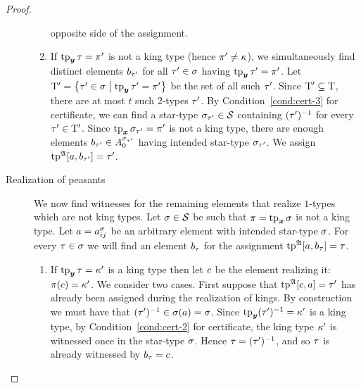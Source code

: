 \begin{proof}
\begin{description}
\begin{enumerate}
  opposite side of the assignment.
  \item If $\operatorname{tp}_{\bm{y}}\tau = {\pi'}$ is not a king type (hence
  ${\pi'} \neq \kappa$), we simultaneously find distinct elements $b_{\tau'}$ for all ${\tau'} \in
  \sigma$ having $\operatorname{tp}_{\bm{y}}{\tau'} = {\pi'}$.
  Let ${\mathrm{T}'} = \left\{{\tau'} \in \sigma\mathrel{}\middle|\mathrel{}\operatorname{tp}_{\bm{y}}{\tau'} = {\pi'}\right\}$ be the set of
  all such ${\tau'}$.
  Since ${\mathrm{T}'} \subseteq \mathrm{T}$, there are
  at most $t$ such $2$-types ${\tau'}$. By Condition~\ref{cond:cert-3} for
  certificate, we can find a star-type $\sigma_{{\tau'}} \in \mathcal{S}$ containing
  $({\tau'})^{-1}$ for every ${\tau'} \in {\mathrm{T}'}$. Since $\operatorname{tp}_{\bm{x}}\sigma_{{\tau'}} =
  {\pi'}$ is not a king type, there are enough elements 
  $b_{{\tau'}} \in A_0^{\sigma_{{\tau'}}}$ having intended star-type
  $\sigma_{{\tau'}}$.
  We assign $\operatorname{tp}^{\mathfrak{A}}[a,b_{\tau'}] = {\tau'}$.
  \end{enumerate}
  \item[Realization of peasants] We now find witnesses for the remaining
  elements that realize $1$-types which are not king types. Let $\sigma \in \mathcal{S}$ be such that $\pi =
  \operatorname{tp}_{\bm{x}}\sigma$ is not a king type. Let $a = a_{ij}^\sigma$ be an arbitrary element
  with intended star-type $\sigma$. For every $\tau \in \sigma$ we will find an
  element $b_\tau$ for the assignment $\operatorname{tp}^{\mathfrak{A}}[a,b_\tau] = \tau$.
  \begin{enumerate}
    \item If $\operatorname{tp}_{\bm{y}}\tau = {\kappa'}$ is a king type then let $c$ be the element
    realizing it: $\pi(c) = {\kappa'}$.
    We consider two cases.
    First suppose that $\operatorname{tp}^{\mathfrak{A}}[c,a] = {\tau'}$ has already been assigned
    during the realization of kings.
    By construction we must have that $({\tau'})^{-1} \in \sigma(a) = \sigma$.
    Since $\operatorname{tp}_{\bm{y}}({\tau'})^{-1} = {\kappa'}$ is a king type,
    by Condition~\ref{cond:cert-2}
    for certificate, the king type ${\kappa'}$ is witnessed once in the star-type
    $\sigma$. Hence $\tau = (\tau')^{-1}$, and so $\tau$ is already witnessed
    by $b_\tau = c$.
    

\end{enumerate}
\end{description}
\end{proof}
